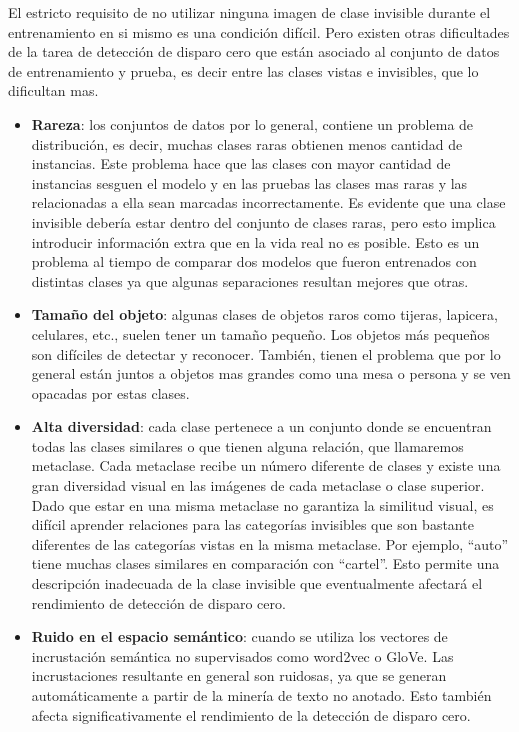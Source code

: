 El estricto requisito de no utilizar ninguna imagen de clase invisible durante el entrenamiento en si mismo es una condición difícil. Pero existen otras dificultades de la tarea de detección de disparo cero que están asociado al conjunto de datos de entrenamiento y prueba, es decir entre las clases vistas e invisibles, que lo dificultan mas.


\begin{itemize}
	\item \textbf{Rareza}: los conjuntos de datos por lo general, contiene un problema de distribución, es decir, muchas clases raras obtienen menos cantidad de instancias. Este problema hace que las clases con mayor cantidad de instancias sesguen el modelo y en las pruebas las clases mas raras y las relacionadas a ella sean marcadas incorrectamente. Es evidente que una clase invisible debería estar dentro del conjunto de clases raras, pero esto implica introducir información extra que en la vida real no es posible. Esto es un problema al tiempo de comparar dos modelos que fueron entrenados con distintas clases ya que algunas separaciones resultan mejores que otras.

	\item \textbf{Tamaño del objeto}: algunas clases de objetos raros como tijeras, lapicera, celulares, etc., suelen tener un tamaño pequeño. Los objetos más pequeños son difíciles de detectar y reconocer. También, tienen el problema que por lo general están juntos a objetos mas grandes como una mesa o persona y se ven opacadas por estas clases.

	\item \textbf{Alta diversidad}: cada clase pertenece a un conjunto donde se encuentran todas las clases similares o que tienen alguna relación, que llamaremos metaclase. Cada metaclase recibe un número diferente de clases y existe una gran diversidad visual en las imágenes de cada metaclase o clase superior. Dado que estar en una misma metaclase no garantiza la similitud visual, es difícil aprender relaciones para las categorías invisibles que son bastante diferentes de las categorías vistas en la misma metaclase. Por ejemplo, ``auto'' tiene muchas clases similares en comparación con ``cartel''. Esto permite una descripción inadecuada de la clase invisible que eventualmente afectará el rendimiento de detección de disparo cero.

	\item \textbf{ Ruido en el espacio semántico}: cuando se utiliza los vectores de incrustación semántica no supervisados como word2vec o GloVe. Las incrustaciones resultante  en general son ruidosas, ya que se generan automáticamente a partir de la minería de texto no anotado. Esto también afecta significativamente el rendimiento de la detección de disparo cero.
\end{itemize}


